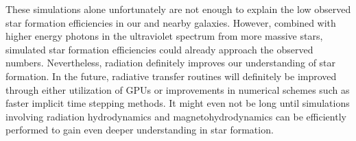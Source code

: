 These simulations alone unfortunately are not enough to explain the low observed star formation efficiencies in our and nearby galaxies.
However, combined with higher energy photons in the ultraviolet spectrum from more massive stars, simulated star formation efficiencies could already approach the observed numbers.
Nevertheless, radiation definitely improves our understanding of star formation.
In the future, radiative transfer routines will definitely be improved through either utilization of GPUs or improvements in numerical schemes such as faster implicit time stepping methods.
It might even not be long until simulations involving radiation hydrodynamics and magnetohydrodynamics can be efficiently performed to gain even deeper understanding in star formation.
